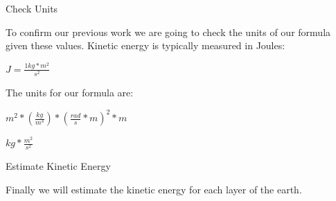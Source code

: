 \documentclass[a4paper, 11pt, oneside]{book} %
\begin{document}
{\LARGE Check Units \\} %
\vspace{0.5\baselineskip} %
\vspace{0.5\baselineskip} %

To confirm our previous work we are going to check the units of our formula given these values. Kinetic energy is typically measured in Joules:\\

\vspace{0.5\baselineskip} %
\vspace{0.5\baselineskip} %

$J=\frac{1kg * m^2}{s^2}$\\

\vspace{0.5\baselineskip} %
\vspace{0.5\baselineskip} %

The units for our formula are:\\

\vspace{0.5\baselineskip} %
\vspace{0.5\baselineskip} %

$m^2 * (\frac{kg}{m^3})*(\frac{rad}{s} * m)^2*m$\\

\vspace{0.5\baselineskip} %
\vspace{0.5\baselineskip} %

$kg * \frac{m^2}{s^2}$\\ 

\vspace{0.5\baselineskip} %
\vspace{0.5\baselineskip} %

{\LARGE Estimate Kinetic Energy \\} %
\vspace{0.5\baselineskip} %
\vspace{0.5\baselineskip} %

Finally we will estimate the kinetic energy for each layer of the earth.\\
\end{document}
